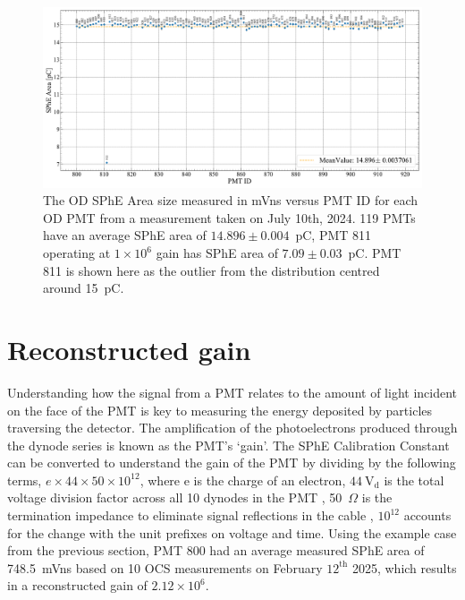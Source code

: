 \begin{figure}[ht!]
    \centering
    \includegraphics[width=\textwidth]{figures/ODCommissioning/SPHE_pC_2024-7-10.pdf}
    \caption[The OD SPhE Area size measured in mVns versus PMT ID for each OD PMT.]{The OD SPhE Area size measured in mVns versus PMT ID for each OD PMT from a measurement taken on July 10th, 2024. 119 PMTs have an average SPhE area of $14.896\pm0.004$~pC, PMT 811 operating at $1\times10^6$ gain has SPhE area of $7.09\pm0.03$~pC. PMT 811 is shown here as the outlier from the distribution centred around 15~pC.}
    \label{fig:ODCommissioning/SPhEValues_pC}
\end{figure}
\section{Reconstructed gain}\label{sec:ODComissioning/RecGain}
Understanding how the signal from a PMT relates to the amount of light incident on the face of the PMT is key to measuring the energy deposited by particles traversing the detector. The amplification of the photoelectrons produced through the dynode series is known as the PMT's `gain'. The SPhE Calibration Constant can be converted to understand the gain of the PMT by dividing by the following terms, $e\times44\times50\times10^{12}$, where e is the charge of an electron, $44~\text{V}_{\text{d}}$ is the total voltage division factor across all 10 dynodes in the PMT \cite{HamamatsuR5912}, 50~$\Omega$ is the termination impedance to eliminate signal reflections in the cable \cite{LZ:2024bvw}, $10^{12}$ accounts for the change with the unit prefixes on voltage and time. Using the example case from the previous section, PMT 800 had an average measured SPhE area of 748.5~mVns based on 10 OCS measurements on February $12^{\text{th}}$ 2025, which results in a reconstructed gain of $2.12\times10^6$.


